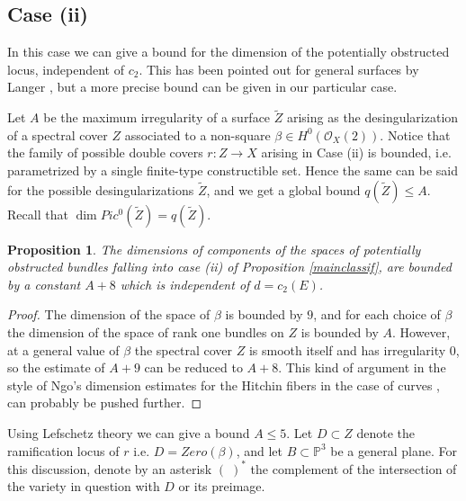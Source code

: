 \documentclass{amsart}
\theoremstyle{plain}
\newtheorem{proposition}[theorem]{Proposition}
\numberwithin{equation}{section}
\begin{document}
\subsection{Case (ii)}

In this case we can give a bound for the dimension of the potentially obstructed
locus, independent of $c_2$. This has been pointed out for general surfaces by
Langer \cite[proof of Theorem 6.3.2]{Langer}, but a more precise bound can be given
in our particular case. 

Let $A$ be the maximum irregularity of a surface $\tilde{Z}$ arising as the
desingularization of a spectral cover $Z$ associated to a non-square $\beta \in H^0({{\mathcal O}} _X(2))$. Notice that the family of possible double covers $r:Z\rightarrow X$ arising in Case (ii) is bounded,
i.e. parametrized by a single finite-type constructible set. Hence the same can be said
for the possible desingularizations $\tilde{Z}$, and we get a global bound 
$q(\tilde{Z})\leq A$. Recall that $\dim Pic ^0(\tilde{Z}) = q(\tilde{Z})$.

\begin{proposition}
\label{iibound}
The dimensions of components of the spaces of potentially obstructed 
bundles falling into case (ii)
of Proposition \ref{mainclassif}, are bounded by a constant $A+8$ which is independent of $d=c_2(E)$.
\end{proposition}
\begin{proof}
The dimension of the space of $\beta$ is bounded by $9$, and for each choice of $\beta$
the dimension of the space of rank one bundles on $Z$ is bounded by $A$. However,
at a general value of $\beta$ the spectral cover $Z$ is smooth itself and has 
irregularity $0$, so the estimate of $A+9$ can be reduced to $A+8$.
This kind of argument in the style of Ngo's dimension estimates
for the Hitchin fibers in the case of curves \cite{Ngo}, can probably be pushed further. 
\end{proof}

Using Lefschetz theory we can give a bound $A\leq 5$. Let $D\subset Z$ denote
the ramification locus of $r$ i.e. $D=Zero (\beta )$, and let $B\subset {{\mathbb P}} ^3$
be a general plane. For this discussion, denote by an asterisk $(\; )^{\ast}$ the complement
of the intersection of the variety in question with $D$ or its preimage.
\end{document}
